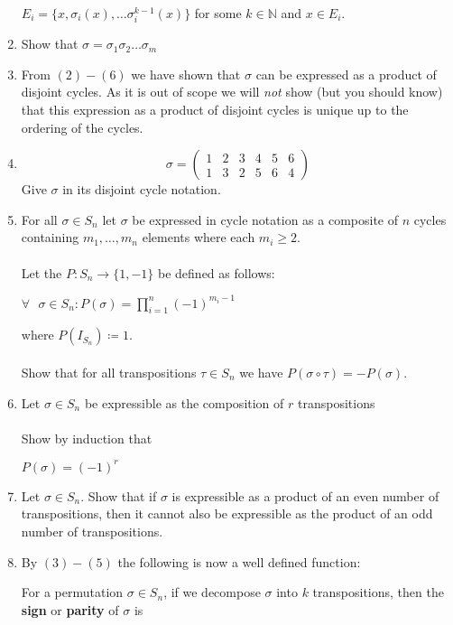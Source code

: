 \documentclass{article}
\begin{document}
\begin{enumerate}
\begin{center}
        $E_i = \{x, \sigma_i(x), \dots \sigma_i^{k-1}(x)\}$ for some $k\in\mathbb{N}$ and $x\in E_i$.
    \end{center}
    \item Show that $\sigma = \sigma_1\sigma_2\dots\sigma_m$
    \item From $(2)-(6)$ we have shown that $\sigma$ can be expressed as a product of disjoint cycles. As it is out of scope we will \emph{not} show (but you should know) that this expression as a product of disjoint cycles is unique up to the ordering of the cycles.
    \item \[
        \sigma = \begin{pmatrix}
        1 & 2 & 3 & 4 & 5 & 6 \\
        1 & 3 & 2 & 5 & 6 & 4
        \end{pmatrix}
        \]
    Give $\sigma$ in its disjoint cycle notation.
    \item For all $\sigma\in S_n$ let $\sigma$ be expressed in cycle notation as a composite of $n$ cycles containing $m_1,\dots,m_n$ elements where each $m_i \ge 2$. 
    \text{}\\\\Let the $P: S_n\rightarrow \{1, -1\}$ be defined as follows:
    \begin{center}
        $\forall\text{ }\sigma\in S_n\colon P(\sigma) = \prod_{i=1}^n(-1)^{m_i-1}$
    \end{center}
    where $P(I_{S_n}) \coloneq 1$. 
    \text{}\\\\Show that for all transpositions $\tau\in S_n$ we have $P(\sigma\circ\tau) = -P(\sigma)$.
    \item Let $\sigma\in S_n$ be expressible as the composition of $r$ transpositions\text{}\\\\Show by induction that
    \begin{center}
        $P(\sigma) = (-1)^r$
    \end{center}
    \item Let $\sigma\in S_n$. Show that if $\sigma$ is expressible as a product of an even number of transpositions, then it cannot also be expressible as the product of an odd number of transpositions.
    \item By $(3)-(5)$ the following is now a well defined function:
    \begin{center}
        For a permutation $\sigma\in S_n$, if we decompose $\sigma$ into $k$ transpositions, then the \textbf{sign} or \textbf{parity} of $\sigma$ is \text{}\\

\end{center}
\end{enumerate}
\end{document}

